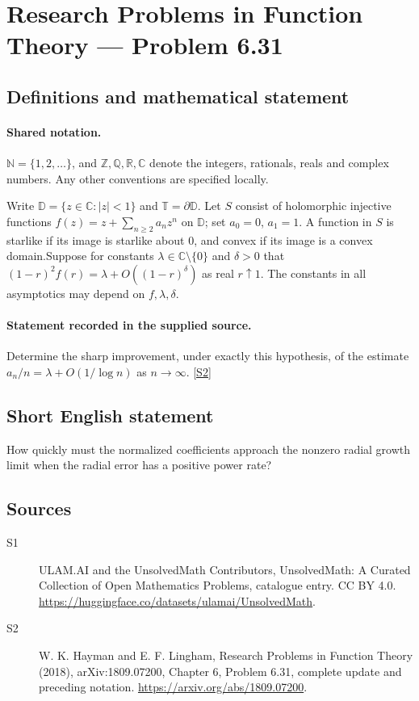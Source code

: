 \documentclass[11pt]{article}
\newcommand{\sref}[2]{\hyperlink{source:#1:#2}{[S#2]}}
\begin{document}
\section{Research Problems in Function Theory — Problem 6.31}\label{statement}

\subsection{Definitions and mathematical statement}

\paragraph{Shared notation.}$\mathbb N=\{1,2,\ldots\}$, and $\mathbb Z,\mathbb Q,\mathbb R,\mathbb C$ denote the integers, rationals, reals and complex numbers. Any other conventions are specified locally.


Write $\mathbb D=\{z\in\mathbb C:|z|<1\}$ and $\mathbb T=\partial\mathbb D$. Let $S$ consist of holomorphic injective functions $f(z)=z+\sum_{n\ge2}a_nz^n$ on $\mathbb D$; set $a_0=0$, $a_1=1$. A function in $S$ is starlike if its image is starlike about $0$, and convex if its image is a convex domain.Suppose for constants $\lambda\in\mathbb C\setminus\{0\}$ and $\delta>0$ that $(1-r)^2f(r)=\lambda+O((1-r)^\delta)$ as real $r\uparrow1$. The constants in all asymptotics may depend on $f,\lambda,\delta$.
\paragraph{Statement recorded in the supplied source.}
Determine the sharp improvement, under exactly this hypothesis, of the estimate $a_n/n=\lambda+O(1/\log n)$ as $n\to\infty$. \sref{statement}{2}
\subsection{Short English statement}
How quickly must the normalized coefficients approach the nonzero radial growth limit when the radial error has a positive power rate?
\subsection{Sources}
\begin{description}
\item[\hypertarget{source:statement:1}{S1}] ULAM.AI and the UnsolvedMath Contributors, UnsolvedMath: A Curated Collection of Open Mathematics Problems, catalogue entry. CC BY 4.0. \url{https://huggingface.co/datasets/ulamai/UnsolvedMath}.
\item[\hypertarget{source:statement:2}{S2}] W. K. Hayman and E. F. Lingham, Research Problems in Function Theory (2018), arXiv:1809.07200, Chapter 6, Problem 6.31, complete update and preceding notation. \url{https://arxiv.org/abs/1809.07200}.
\end{description}
\label{end:statement}
\end{document}
